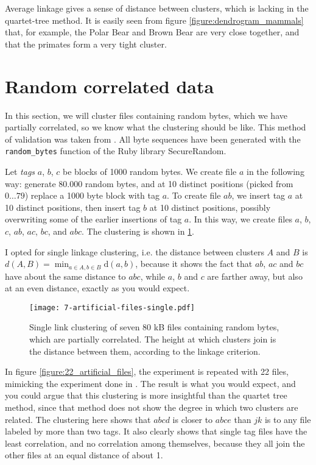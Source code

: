 Average linkage gives a sense of distance between clusters, which is lacking in the quartet-tree method. It is easily seen from figure \ref{figure:dendrogram_mammals} that, for example, the Polar Bear and Brown Bear are very close together, and that the primates form a very tight cluster.

\section{Random correlated data}

In this section, we will cluster files containing random bytes, which we have partially correlated, so we know what the clustering should be like. This method of validation was taken from \cite{Cilibrasi2005}. All byte sequences have been generated with the \lstinline{random_bytes} function of the Ruby library SecureRandom.

Let \emph{tags} $a$, $b$, $c$ be blocks of 1000 random bytes. We create file $a$ in the following way: generate 80.000 random bytes, and at 10 distinct positions (picked from $0 \dots 79$) replace a 1000 byte block with tag $a$. To create file $ab$, we insert tag $a$ at 10 distinct positions, then insert tag $b$ at 10 distinct positions, possibly overwriting some of the earlier insertions of tag $a$. In this way, we create files $a$, $b$, $c$, $ab$, $ac$, $bc$, and $abc$. The clustering is shown in \ref{figure:7_artificial_files}.

I opted for single linkage clustering, i.e. the distance between clusters $A$ and $B$ is $d(A, B) = \min_{a \in A, b \in B} \text{d}(a, b)$, because it shows the fact that $ab$, $ac$ and $bc$ have about the same distance to $abc$, while $a$, $b$ and $c$ are farther away, but also at an even distance, exactly as you would expect.

\begin{figure}[h!]
  \texttt{[image: 7-artificial-files-single.pdf]}
  \caption{Single link clustering of seven 80 kB files containing random bytes, which are partially correlated. The height at which clusters join   is the distance between them, according to the linkage criterion.}
  \label{figure:7_artificial_files}
\end{figure}

In figure \ref{figure:22_artificial_files}, the experiment is repeated with 22 files, mimicking the experiment done in \cite{Cilibrasi2005}. The result is what you would expect, and you could argue that this clustering is more insightful than the quartet tree method, since that method does not show the degree in which two clusters are related. The clustering here shows that $abcd$ is closer to $abce$ than $jk$ is to any file labeled by more than two tags. It also clearly shows that single tag files have the least correlation, and no correlation among themselves, because they all join the other files at an equal distance of about 1.

